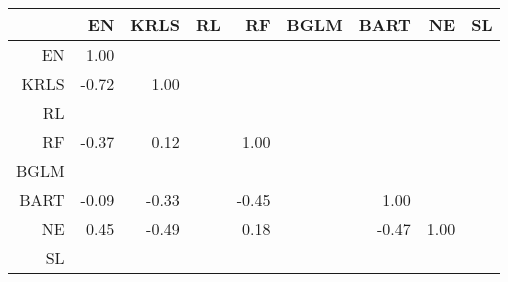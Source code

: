 \begin{table}[ht]
\centering
\begin{tabular}{rrrrrrrrr}
  \hline
 & EN & KRLS & RL & RF & BGLM & BART & NE & SL \\ 
  \hline
EN & 1.00 &  &  &  &  &  &  &  \\ 
  KRLS & -0.72 & 1.00 &  &  &  &  &  &  \\ 
  RL &  &  &  &  &  &  &  &  \\ 
  RF & -0.37 & 0.12 &  & 1.00 &  &  &  &  \\ 
  BGLM &  &  &  &  &  &  &  &  \\ 
  BART & -0.09 & -0.33 &  & -0.45 &  & 1.00 &  &  \\ 
  NE & 0.45 & -0.49 &  & 0.18 &  & -0.47 & 1.00 &  \\ 
  SL &  &  &  &  &  &  &  &  \\ 
   \hline
\end{tabular}
\end{table}
